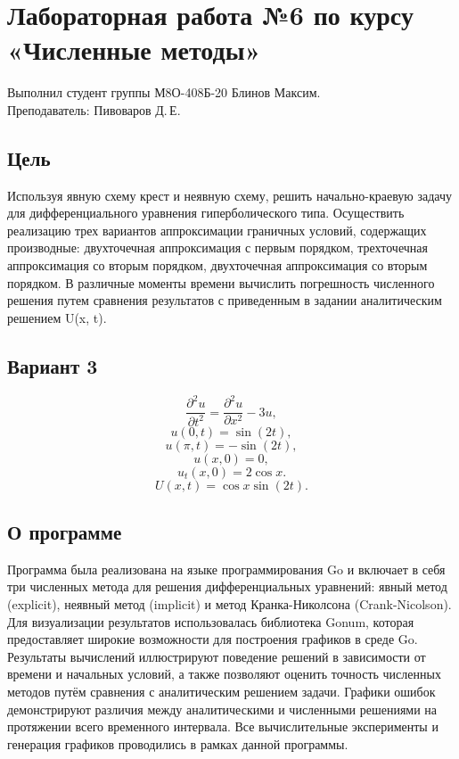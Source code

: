 \documentclass{article}
\begin{document}
\section*{Лабораторная работа №6 по курсу «Численные методы»}

Выполнил студент группы М8О-408Б-20 Блинов Максим.
\\
Преподаватель: Пивоваров Д.\,Е.

\subsection*{Цель}

Используя явную схему крест и неявную схему, решить начально-краевую задачу 
для дифференциального уравнения гиперболического типа. Осуществить реализацию 
трех вариантов аппроксимации граничных условий, содержащих производные: 
двухточечная аппроксимация с первым порядком, трехточечная аппроксимация со вторым порядком, 
двухточечная аппроксимация со вторым порядком. В различные моменты времени вычислить 
погрешность численного решения путем сравнения результатов с приведенным в задании аналитическим решением U(x, t).

\subsection*{Вариант 3}
$$\frac{\partial^2 u}{\partial t^2} = \frac{\partial^2 u}{\partial x^2} - 3u,$$
$$u(0, t) = \sin(2t),$$
$$u(\pi, t) = - \sin(2t),$$
$$u(x, 0) = 0,$$
$$u_t(x, 0) = 2 \cos x.$$
 $$U(x, t) = \cos x \sin(2t).$$



\subsection*{О программе}

Программа была реализована на языке программирования Go и включает в себя три численных метода для решения дифференциальных уравнений: 
явный метод (explicit), неявный метод (implicit) и метод Кранка-Николсона (Crank-Nicolson). Для визуализации результатов использовалась библиотека Gonum, 
которая предоставляет широкие возможности для построения графиков в среде Go. Результаты вычислений иллюстрируют поведение решений в зависимости от времени 
и начальных условий, а также позволяют оценить точность численных методов путём сравнения с аналитическим решением задачи. 
Графики ошибок демонстрируют различия между аналитическими и численными решениями на протяжении всего временного интервала. 
Все вычислительные эксперименты и генерация графиков проводились в рамках данной программы.
\end{document}
